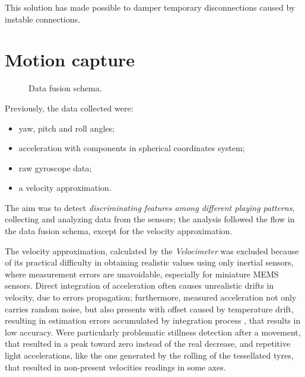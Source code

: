 This solution has made possible to damper temporary disconnections caused by instable connections.

\section{Motion capture}

\begin{center}
	\begin{figure}[ht!]
		\caption{Data fusion schema.}
	\end{figure}
\end{center}
Previously, the data collected were:
\begin{itemize}
	\item yaw, pitch and roll angles;
	\item acceleration with components in spherical coordinates system;
	\item raw gyroscope data;
	\item a velocity approximation.
\end{itemize}
\bigbreak

The aim was to detect \textit{discriminating features among different playing patterns}, collecting and analyzing data from the sensors; the analysis followed the flow in the data fusion schema, except for the velocity approximation.
\bigbreak

The velocity approximation, calculated by the \textit{Velocimeter} \cite{Pio19} was excluded because of its practical difficulty in obtaining realistic values using only inertial sensors, where measurement errors are unavoidable, especially for miniature MEMS sensors. Direct integration of acceleration often causes unrealistic drifts in velocity, due to errors propagation; furthermore, measured acceleration not only carries random noise, but also presents with offset caused by temperature drift, resulting in estimation errors accumulated by integration process \cite{Du15, Est14, Kow15, Liu01, Sei07, UsingAcc, Woo07, Yan06}, that results in low accuracy. Were particularly problematic stillness detection after a movement, that resulted in a peak toward zero instead of the real decrease, and repetitive light accelerations, like the one generated by the rolling of the tessellated tyres, that resulted in non-present velocities readings in some axes.
\bigbreak

